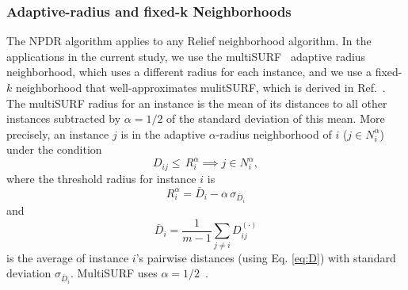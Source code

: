 \documentclass[10pt]{article}
\begin{document}

\subsubsection{Adaptive-radius and fixed-k Neighborhoods}
The NPDR algorithm applies to any Relief neighborhood algorithm. In the applications in the current study, we use the multiSURF~\cite{urbanowicz17} adaptive radius neighborhood, which uses a different radius for each instance, and we use a fixed-$k$ neighborhood that well-approximates mulitSURF, which is derived in Ref.~\cite{bod}. The multiSURF radius for an instance is the mean of its distances to all other instances subtracted by $\alpha=1/2$ of the standard deviation of this mean. 
More precisely, an instance $j$ is in the adaptive $\alpha$-radius neighborhood of $i$ ($j \in N^{\alpha}_{i}$) under the condition
%
%
\begin{equation}
D_{ij} \le \, R_i^{\alpha} \implies j \in N^{\alpha}_{i},
\end{equation}
where the threshold radius for instance $i$ is
\begin{equation} 
R_i^{\alpha} =  \bar{D}_i - \alpha \, \sigma_{\bar{D}_i}
\end{equation}
and 
\begin{equation}
\bar{D}_i = \frac{1}{m-1} \sum_{j \ne i} D^{(\cdot)}_{ij}
\end{equation}
is the average of instance $i$'s pairwise distances (using Eq. \ref{eq:D}) with standard deviation $\sigma_{\bar{D}_i}$. MultiSURF uses $\alpha=1/2$~\cite{msurf13}. 
 
\end{document}
